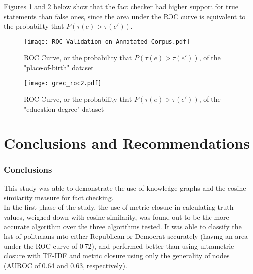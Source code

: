 \documentclass[10pt,11pt,12pt,oneside]{book}
\begin{document}
\newpage


Figures \ref{pob_roc} and \ref{pob_roc2} below show that the fact checker had higher support for true statements than false ones, since the area under the ROC curve is equivalent to the probability that $ P (\tau (e) > \tau (e \prime)) $.\\

\begin{figure}[H]
	\begin{center}
		\texttt{[image: ROC\_Validation\_on\_Annotated\_Corpus.pdf]}\\
		\caption{ROC Curve, or the probability that $ P (\tau (e) > \tau (e \prime)) $, of the "place-of-birth" dataset}
		\label{pob_roc}
	\end{center}
\end{figure}

\begin{figure}[H]
	\begin{center}
		\texttt{[image: grec\_roc2.pdf]}\\
		\caption{ROC Curve, or the probability that $ P (\tau (e) > \tau (e \prime)) $, of the "education-degree" dataset}
		\label{pob_roc2}
	\end{center}
\end{figure}



\newpage

\chapter{Conclusions and Recommendations}

\subsection{Conclusions}
This study was able to demonstrate the use of knowledge graphs and the cosine similarity measure for fact checking. \\

In the first phase of the study, the use of metric closure in calculating truth values, weighed down with cosine similarity, was found out to be the more accurate algorithm over the three algorithms tested. It was able to classify the list of politicians into either Republican or Democrat accurately (having an area under the ROC curve of 0.72), and performed better than using ultrametric closure with TF-IDF and metric closure using only the generality of nodes (AUROC of 0.64 and 0.63, respectively).\\
\end{document}
